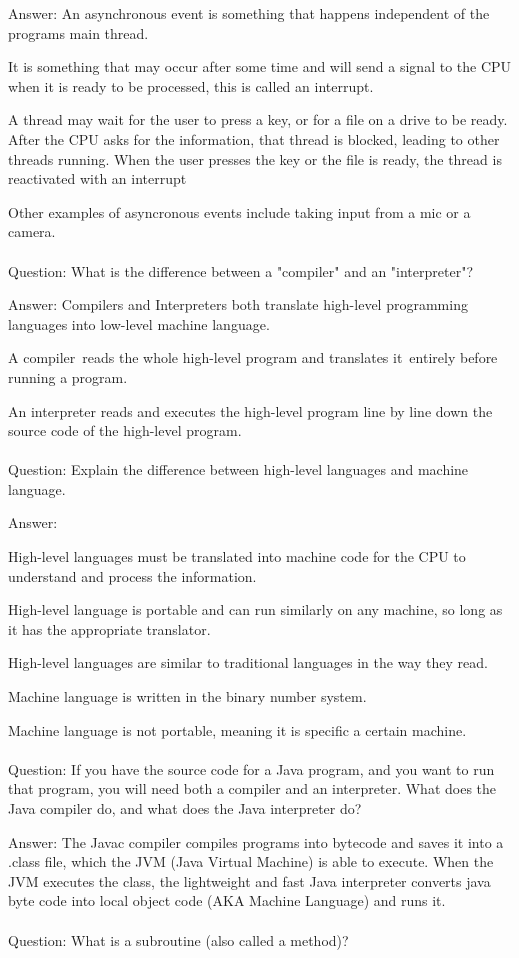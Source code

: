 \documentclass{article}
\begin{document}
Answer: An asynchronous event is something that happens independent of the programs main thread.

It is something that may occur after some time and will send a signal to the CPU when it is ready to be processed, this is called an interrupt.

A thread may wait for the user to press a key, or for a file on a drive to be ready. After the CPU asks for the information, that thread is blocked, leading to other threads running. When the user presses the key or the file is ready, the thread is reactivated with an interrupt

Other examples of asyncronous events include taking input from a mic or a camera.
\\
\\
Question: What is the difference between a "compiler" and an "interpreter"?

Answer: Compilers and Interpreters both translate high-level programming languages into low-level machine language.

A compiler reads the whole high-level program and translates it entirely before running a program.

An interpreter reads and executes the high-level program line by line down the source code of the high-level program.
\\
\\
Question: Explain the difference between high-level languages and machine language.

Answer: 

High-level languages must be translated into machine code for the CPU to understand and process the information.

High-level language is portable and can run similarly on any machine, so long as it has the appropriate translator.

High-level languages are similar to traditional languages in the way they read.

Machine language is written in the binary number system. 

Machine language is not portable, meaning it is specific a certain machine.
\\
\\
Question: If you have the source code for a Java program, and you want to run that program, you will need both a compiler and an interpreter. What does the Java compiler do, and what does the Java interpreter do?

Answer: The Javac compiler compiles programs into bytecode and saves it into a .class file, which the JVM (Java Virtual Machine) is able to execute. When the JVM executes the class, the lightweight and fast Java interpreter converts java byte code into local object code (AKA Machine Language) and runs it.
\\
\\
Question: What is a subroutine (also called a method)?
\end{document}
